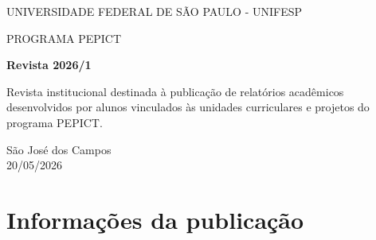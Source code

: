 \documentclass[12pt,openright,oneside,a4paper]{report}
\begin{document}
\begin{titlepage}

    \centering

    {\Large UNIVERSIDADE FEDERAL DE SÃO PAULO - UNIFESP \par}

    \vspace{0.5cm}

    {\large PROGRAMA PEPICT \par}

    \vspace{4cm}

    {\bfseries\LARGE Revista 2026/1 \par}

    \vspace{2cm}

    \hspace{.45\textwidth}
    \begin{minipage}{.5\textwidth}
        \selectfont
        Revista institucional destinada à publicação de relatórios acadêmicos 
        desenvolvidos por alunos vinculados às unidades curriculares e projetos do programa PEPICT.
    \end{minipage}

    \vfill

    \begin{center}
        São José dos Campos \\
        20/05/2026
    \end{center}

\end{titlepage}


\chapter*{Informações da publicação}

\thispagestyle{empty}
\end{document}
